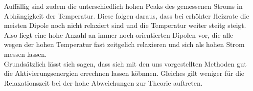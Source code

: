 Auffällig sind zudem die unterschiedlich hohen Peaks des gemessenen Stroms in Abhängigkeit der Temperatur. 
Diese folgen daraus, dass bei erhöhter Heizrate die meisten Dipole noch nicht relaxiert sind und die Temperatur weiter steitg steigt.
Also liegt eine hohe Anzahl an immer noch orientierten Dipolen vor, die alle wegen der hohen Temperatur fast zeitgelich relaxieren und sich 
als hohen Strom messen lassen.
\\
\newline
Grundsätzlich lässt sich sagen, dass sich mit den uns vorgestellten Methoden gut die Aktivierungsenergien errechnen lassen köbnnen.
Gleiches gilt weniger für die Relaxationszeit bei der hohe Abweichungen zur Theorie auftreten. 

























